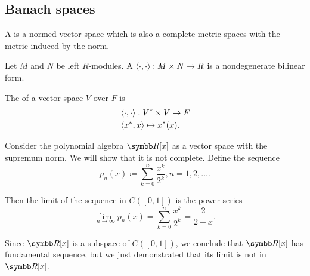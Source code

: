\subsection{Banach spaces}\label{subsec:banach_spaces}

\begin{definition}\label{def:banach_space}
  A  is a normed vector space which is also a complete metric spaces with the metric induced by the norm.
\end{definition}

\begin{definition}\label{def:topological_duality_pairing}
  Let \( M \) and \( N \) be left \( R \)-modules. A  \( \left\langle \cdot, \cdot \right\rangle: M \times N \to R \) is a nondegenerate bilinear form.

  The  of a vector space \( V \) over \( F \) is
  \begin{align*}
    &\left\langle \cdot, \cdot \right\rangle: V^* \times V \to F \\
    &\left\langle x^*, x \right\rangle \mapsto x^*(x).
  \end{align*}
\end{definition}

\begin{example}\label{ex:noncomplete_normed_space}\cite{MathCounterExamples:noncomplete_normed_space}
  Consider the polynomial algebra \( \R[x] \) as a vector space with the supremum norm. We will show that it is not complete. Define the sequence
  \begin{equation*}
    p_n(x) \coloneqq \sum_{k=0}^n \frac{x^k} {2^k}, n = 1, 2, \ldots.
  \end{equation*}

  Then the limit of the sequence in \( C([0, 1]) \) is the power series
  \begin{equation*}
    \lim_{n \to \infty} p_n(x)
    =
    \sum_{k=0}^n \frac{x^k} {2^k}
    =
    \frac 2 {2 - x}.
  \end{equation*}

  Since \( \R[x] \) is a subspace of \( C([0, 1]) \), we conclude that \( \R[x] \) has fundamental sequence, but we just demonstrated that its limit is not in \( \R[x] \).
\end{example}

